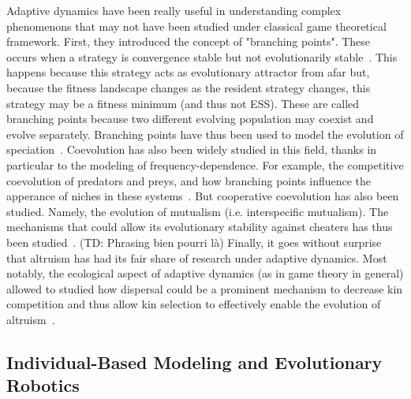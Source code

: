     Adaptive dynamics have been really useful in understanding complex phenomenons that may not have been studied under classical game theoretical framework. First, they introduced the concept of "branching points". These occurs when a strategy is convergence stable but not evolutionarily stable~\parencite{Geritz1998}. This happens because this strategy acts as evolutionary attractor from afar but, because the fitness landscape changes as the resident strategy changes, this strategy may be a fitness minimum (and thus not ESS). These are called branching points because two different evolving population may coexist and evolve separately. Branching points have thus been used to model the evolution of speciation~\parencite{Geritz2004}. Coevolution has also been widely studied in this field, thanks in particular to the modeling of frequency-dependence. For example, the competitive coevolution of predators and preys, and how branching points influence the apperance of niches in these systems~\parencite{Bowers2003}. But cooperative coevolution has also been studied. Namely, the evolution of mutualism (i.e. interspecific mutualism). The mechanisms that could allow its evolutionary stability against cheaters has thus been studied~\parencite{Ferriere2002, McGill2005}. (TD: Phrasing bien pourri là) Finally, it goes without surprise that altruism has had its fair share of research under adaptive dynamics. Most notably, the ecological aspect of adaptive dynamics (as in game theory in general) allowed to studied how dispersal could be a prominent mechanism to decrease kin competition and thus allow kin selection to effectively enable the evolution of altruism~\parencite{LeGalliard2003, LeGalliard2005}.

    

  \subsection{Individual-Based Modeling and Evolutionary Robotics}

